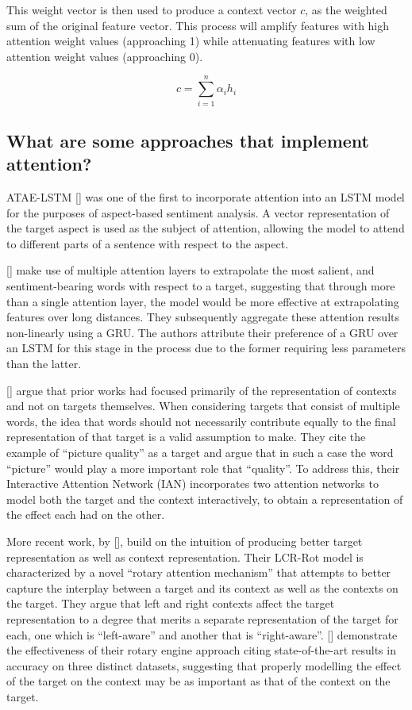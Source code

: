 \documentclass[12pt, a4paper]{report}
\theoremstyle{definition}
\theoremstyle{definition}%
\theoremstyle{definition}%
\theoremstyle{definition}%
\theoremstyle{definition}%
\theoremstyle{definition}%
\renewcommand{\cite}[1]{[\citealp{#1}]}
\begin{document}
This weight vector is then used to produce a context vector $c$, as the weighted sum of the original feature vector. This process will amplify features with high attention weight values (approaching 1) while attenuating features with low attention weight values (approaching 0).

\begin{equation} \label{eq:attention_weighted_sum}
	c = \sum_{i=1}^{n}\alpha_{i}h_{i}
\end{equation}

\subsection{What are some approaches that implement attention?}
ATAE-LSTM \cite{wang} was one of the first to incorporate attention into an LSTM model for the purposes of aspect-based sentiment analysis. A vector representation of the target aspect is used as the subject of attention, allowing the model to attend to different parts of a sentence with respect to the aspect.

\cite{chen2017} make use of multiple attention layers to extrapolate the most salient, and sentiment-bearing words with respect to a target, suggesting that through more than a single attention layer, the model would be more effective at extrapolating features over long distances. They subsequently aggregate these attention results non-linearly using a GRU. The authors attribute their preference of a GRU over an LSTM for this stage in the process due to the former requiring less parameters than the latter.

\cite{dehongma2017} argue that prior works had focused primarily of the representation of contexts and not on targets themselves. When considering targets that consist of multiple words, the idea that words should not necessarily contribute equally to the final representation of that target is a valid assumption to make. They cite the example of \enquote{picture quality} as a target and argue that in such a case the word \enquote{picture} would play a more important role that \enquote{quality}. To address this, their Interactive Attention Network (IAN) incorporates two attention networks to model both the target and the context interactively, to obtain a representation of the effect each had on the other.

More recent work, by \cite{zheng2018}, build on the intuition of producing better target representation as well as context representation. Their LCR-Rot model is characterized by a novel \enquote{rotary attention mechanism} that attempts to better capture the interplay between a target and its context as well as the contexts on the target. They argue that left and right contexts affect the target representation to a degree that merits a separate representation of the target for each, one which is \enquote{left-aware} and another that is \enquote{right-aware}. \cite{zheng2018} demonstrate the effectiveness of their rotary engine approach citing state-of-the-art results in accuracy on three distinct datasets, suggesting that properly modelling the effect of the target on the context may be as important as that of the context on the target.
\end{document}
